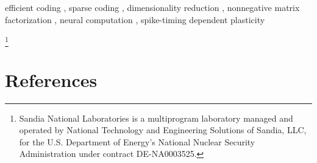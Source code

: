 \documentclass[review,12pt,sort&compress]{elsarticle}
\begin{document}
\begin{frontmatter}



\begin{keyword}
efficient coding \sep
sparse coding \sep
dimensionality reduction \sep
nonnegative matrix factorization \sep
neural computation \sep
spike-timing dependent plasticity
\end{keyword}

\end{frontmatter}
\footnote{Sandia National Laboratories is a multiprogram laboratory managed and operated by National Technology and Engineering Solutions of Sandia, LLC, for the U.S. Department of Energy's National Nuclear Security Administration under contract DE-NA0003525.}


\setcounter{secnumdepth}{0} %






% 





% 




\clearpage
\section{References}


\end{document}
